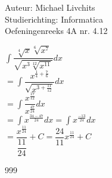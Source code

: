 \documentclass[a4paper]{article}
\begin{document}
  
\noindent \large Auteur: Michael Livchits \\
\noindent \large Studierichting: Informatica\\
\noindent \large Oefeningenreeks 4A nr. 4.12\\

\medskip

\normalsize

$\displaystyle\int\dfrac{\sqrt[4]{x}\sqrt[6]{x^7}}{\sqrt{x^3\sqrt[12]{x^{11}}}}dx$\\

$= \displaystyle\int\dfrac{x^{\tfrac{1}{4}+\tfrac{7}{6}}}{\sqrt{x^{3+\tfrac{11}{12}}}}dx$\\

$= \displaystyle\int\dfrac{x^{\tfrac{17}{12}}}{x^{\tfrac{47}{24}}}dx$\\

$= \displaystyle\int x^{\tfrac{34-47}{24}}dx = \displaystyle\int x^{\tfrac{-13}{24}}dx$\\

$= \dfrac{x^{\tfrac{11}{24}}}{\dfrac{11}{24}} + C = \dfrac{24}{11}x^{\tfrac{11}{24}} + C$\\

\begin{thebibliography}{999}
\end{thebibliography}
\end{document}
